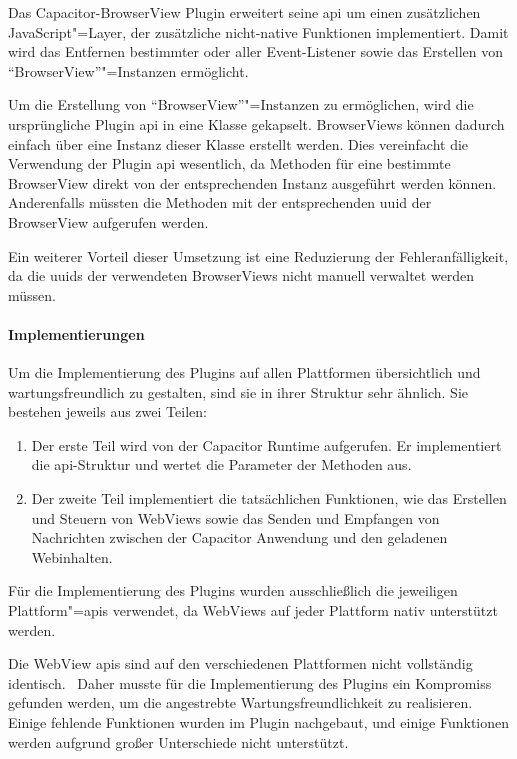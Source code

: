 Das Capacitor-BrowserView Plugin erweitert seine \ac{api} um einen zusätzlichen JavaScript"=Layer, der zusätzliche nicht-native Funktionen implementiert.
Damit wird das Entfernen bestimmter oder aller Event-Listener sowie das Erstellen von \enquote{BrowserView}"=Instanzen ermöglicht.

Um die Erstellung von \enquote{BrowserView}"=Instanzen zu ermöglichen, wird die ursprüngliche Plugin \ac{api} in eine Klasse gekapselt.
BrowserViews können dadurch einfach über eine Instanz dieser Klasse erstellt werden.
Dies vereinfacht die Verwendung der Plugin \ac{api} wesentlich, da Methoden für eine bestimmte BrowserView direkt von der entsprechenden Instanz ausgeführt werden können.
Anderenfalls müssten die Methoden mit der entsprechenden \ac{uuid} der BrowserView aufgerufen werden.

Ein weiterer Vorteil dieser Umsetzung ist eine Reduzierung der Fehleranfälligkeit, da die \acp{uuid} der verwendeten BrowserViews nicht manuell verwaltet werden müssen.

\newpage

\paragraph{Implementierungen}

Um die Implementierung des Plugins auf allen Plattformen übersichtlich und wartungsfreundlich zu gestalten, sind sie in ihrer Struktur sehr ähnlich.
Sie bestehen jeweils aus zwei Teilen:

\begin{enumerate}
  \item 
  Der erste Teil wird von der Capacitor Runtime aufgerufen.
  Er implementiert die \acs{api}-Struktur und wertet die Parameter der Methoden aus.
  \item
  Der zweite Teil implementiert die tatsächlichen Funktionen, wie das Erstellen und Steuern von WebViews
  sowie das Senden und Empfangen von Nachrichten zwischen der Capacitor Anwendung und den geladenen Webinhalten.
\end{enumerate}

Für die Implementierung des Plugins wurden ausschließlich die jeweiligen Plattform"=\acsp{api} verwendet, da WebViews auf jeder Plattform nativ unterstützt werden.
\cite{android:api, ios:api, electron:docs}

Die WebView \acsp{api} sind auf den verschiedenen Plattformen nicht vollständig identisch.~\cite{android:api, electron:docs}
Daher musste für die Implementierung des Plugins ein Kompromiss gefunden werden, um die angestrebte Wartungsfreundlichkeit zu realisieren.
Einige fehlende Funktionen wurden im Plugin nachgebaut, und einige Funktionen werden aufgrund großer Unterschiede nicht unterstützt.

